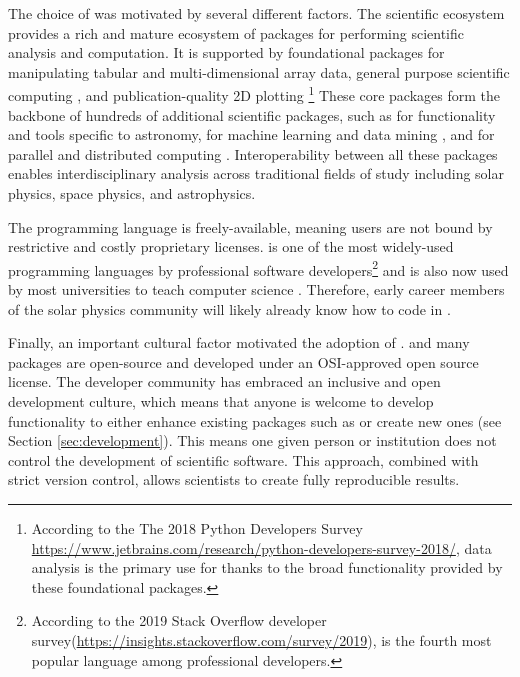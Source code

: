 The choice of \python was motivated by several different factors.
The scientific \python ecosystem provides a rich and mature ecosystem of packages for performing scientific analysis and computation.
It is supported by foundational packages for manipulating tabular \citep[\pandaspkg,][]{pandas} and multi-dimensional array \citep[\numpypkg,][]{numpy} data, general purpose scientific computing \citep[\scipypkg,][]{scipy}, and publication-quality 2D plotting \citep[\matplotlibpkg,][]{matplotlib}\footnote{According to the The 2018 Python Developers Survey \url{https://www.jetbrains.com/research/python-developers-survey-2018/}, data analysis is the primary use for \python thanks to the broad functionality provided by these foundational packages.}
These core packages form the backbone of hundreds of additional scientific \python packages, such as \astropypkg for functionality and tools specific to astronomy,  for machine learning and data mining \citep{pedregosa11}, and  for parallel and distributed computing \citep{rocklin15}.
Interoperability between all these packages enables interdisciplinary analysis across traditional fields of study including solar physics, space physics, and astrophysics.

The \python programming language is freely-available, meaning users are not bound by restrictive and costly proprietary licenses.
\python is one of the most widely-used programming languages by professional software developers\footnote{According to the 2019 Stack Overflow developer survey(\url{https://insights.stackoverflow.com/survey/2019}), \python is the fourth most popular language among professional developers.} and is also now used by most universities to teach computer science \citep{guo2014}.
Therefore, early career members of the solar physics community will likely already know how to code in \python.

Finally, an important cultural factor motivated the adoption of \python.
\python and many \python packages are open-source and developed under an OSI-approved open source license.
The \python developer community has embraced an inclusive and open development culture, which means that anyone is welcome to develop functionality to either enhance existing packages such as \sunpypkg or create new ones (see Section \ref{sec:development}).
This means one given person or institution does not control the development of scientific \python software.
This approach, combined with strict version control, allows scientists to create fully reproducible results.


